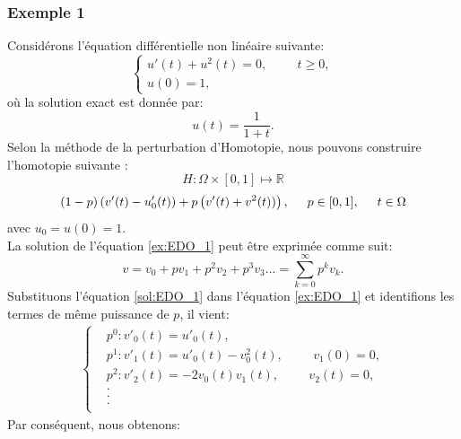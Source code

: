 \subsubsection*{Exemple 1}
Considérons l'équation différentielle non linéaire suivante:
\begin{equation} \label{ex:EDO_1}
    \begin{cases}
        u'(t)+u^2(t)=0, \hspace{1cm} t\geq 0,\\
        u(0)=1,
    \end{cases}
\end{equation}
où la solution exact est donnée par:
\begin{equation}
    u(t)=\frac{1}{1+t}.
\end{equation}
Selon la méthode de la perturbation d'Homotopie, nous pouvons construire l'homotopie suivante :
\begin{equation*}
    H: \Omega\times[0,1] \mapsto\mathbb{R}
\end{equation*}
\begin{align}
    (1-p)\left(v'(t)-u'_0(t)\right)+p\left(v'(t)+v^2 (t))\right), \hspace{0.5cm} p\in[0,1], \hspace{0.5cm} t\in \Omega
\end{align}
avec $u_0=u(0)=1$.\\
La solution de l'équation \ref{ex:EDO_1} peut être exprimée comme suit:
\begin{equation}\label{sol:EDO_1}
    v=v_0+pv_1+p^2v_2+p^3v_3...=\sum_{k=0}^{\infty} p^{k}v_k.
\end{equation}
Substituons l'équation \ref{sol:EDO_1} dans l'équation \ref{ex:EDO_1} et identifions les termes de même puissance de $p$, il vient:
\begin{align*}
    \begin{cases}
        &p^0 : v'_0(t) = u'_0(t),\\
        &p^1 : v'_1(t) = u'_0(t)-v^2_0(t), \hspace{1cm} v_1(0)=0,\\
        &p^2 : v'_2(t) = -2v_0(t)v_1(t), \hspace{1cm} v_2(t)=0,\\
        &    .\\
        &    .\\
        &    .\\
    \end{cases}
\end{align*}
Par conséquent, nous obtenons:
